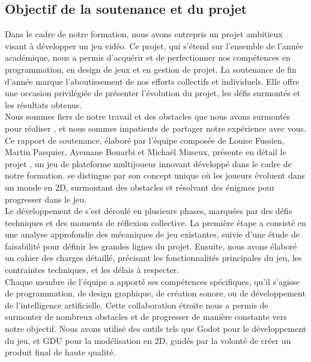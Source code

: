 

\subsection{Objectif de la soutenance et du projet}



Dans le cadre de notre formation, nous avons entrepris un projet ambitieux visant à développer un jeu vidéo. 
Ce projet, qui s'étend sur l'ensemble de l'année académique, nous a permis d'acquérir et de perfectionner nos compétences en programmation,
 en design de jeux et en gestion de projet. La soutenance de fin d'année marque l'aboutissement de nos efforts collectifs et individuels.
  Elle offre une occasion privilégiée de présenter l'évolution du projet, les défis surmontés et les résultats obtenus.
\\

Nous sommes fiers de notre travail et des obstacles que nous avons surmontés pour réaliser \gameName, 
et nous sommes impatients de partager notre expérience avec vous.
\\

Ce rapport de soutenance, élaboré par l'équipe composée de Louise Fussien, Martin Pasquier, Ayemane Bouarbi et Michaël Museux, présente 
en détail le projet \gameName, un jeu de plateforme multijoueur innovant développé dans le cadre de notre formation. \gameName  se distingue par son concept unique 
où les joueurs évoluent dans un monde en 2D, surmontant des obstacles et résolvant des énigmes pour progresser dans le jeu.
\\

Le développement de \gameName  s'est déroulé en plusieurs phases, marquées par des défis techniques et des moments de réflexion collective. 
La première étape a consisté en une analyse approfondie des mécaniques de jeu existantes, suivie d'une étude de faisabilité pour définir les grandes lignes du projet. 
Ensuite, nous avons élaboré un cahier des charges détaillé, précisant les fonctionnalités principales du jeu, les contraintes techniques, et les délais à respecter.
\\

Chaque membre de l'équipe a apporté ses compétences spécifiques, qu'il s'agisse de programmation, de design graphique, de création sonore, ou de développement de 
l'intelligence artificielle. Cette collaboration étroite nous a permis de surmonter de nombreux obstacles et de progresser de manière constante vers notre objectif.
 Nous avons utilisé des outils tels que Godot pour le développement du jeu, et GDU pour la modélisation en 2D, guidés par la volonté de créer un produit final de haute qualité.
\\

